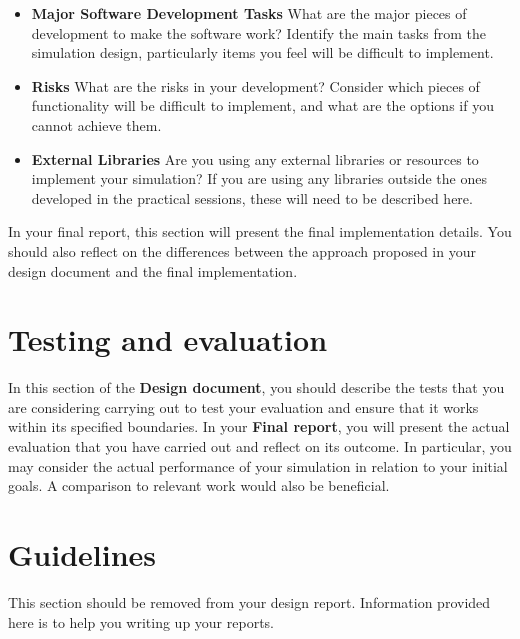 \documentclass[conference,backref=page]{acmsiggraph}
\begin{document}
\begin{itemize}
\item  {\bf Major Software Development Tasks} What are the major pieces of development to make the software work?  Identify the main tasks from the simulation design, particularly items you feel will be difficult to implement. 
\item {\bf Risks} What are the risks in your development?  Consider which pieces of functionality will be difficult to implement, and what are the options if you cannot achieve them.
\item {\bf External Libraries} Are you using any external libraries or resources to implement your simulation?  If you are using any libraries outside the ones developed in the practical sessions, these will need to be described here.
\end{itemize}

In your final report, this section will present the final implementation details. You should also reflect on the differences between the approach proposed in your design document and the final implementation.

\section{Testing and evaluation}
In this section of the {\bf Design document}, you should describe the tests that you are considering carrying out to test your evaluation and ensure that it works within its specified boundaries. In your {\bf Final report}, you will present the actual evaluation that you have carried out and reflect on its outcome. In particular, you may consider the actual performance of your simulation in relation to your initial goals. A comparison to relevant work would also be beneficial.

\section{Guidelines}
This section should be removed from your design report. Information provided here is to help you writing up your reports.
\end{document}
